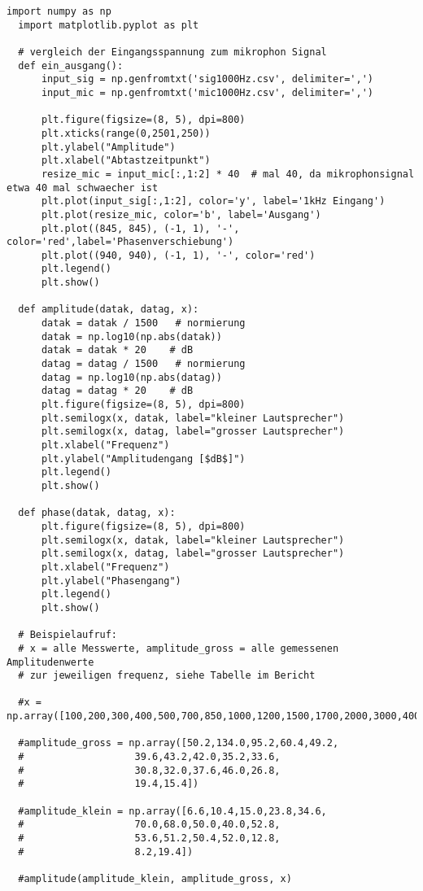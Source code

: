 
 \begin{lstlisting}[style=PYTHON,frame=single,
  caption=Erstellen der Grafiken
  captionpos=b,
  label=lst:plot]
  import numpy as np
  import matplotlib.pyplot as plt
  
  # vergleich der Eingangsspannung zum mikrophon Signal
  def ein_ausgang():
      input_sig = np.genfromtxt('sig1000Hz.csv', delimiter=',')
      input_mic = np.genfromtxt('mic1000Hz.csv', delimiter=',')    
      
      plt.figure(figsize=(8, 5), dpi=800)
      plt.xticks(range(0,2501,250))
      plt.ylabel("Amplitude")
      plt.xlabel("Abtastzeitpunkt")
      resize_mic = input_mic[:,1:2] * 40  # mal 40, da mikrophonsignal etwa 40 mal schwaecher ist
      plt.plot(input_sig[:,1:2], color='y', label='1kHz Eingang')
      plt.plot(resize_mic, color='b', label='Ausgang')
      plt.plot((845, 845), (-1, 1), '-', color='red',label='Phasenverschiebung')
      plt.plot((940, 940), (-1, 1), '-', color='red')
      plt.legend()
      plt.show()
  
  def amplitude(datak, datag, x):
      datak = datak / 1500   # normierung
      datak = np.log10(np.abs(datak))
      datak = datak * 20    # dB
      datag = datag / 1500   # normierung
      datag = np.log10(np.abs(datag))
      datag = datag * 20    # dB
      plt.figure(figsize=(8, 5), dpi=800)   
      plt.semilogx(x, datak, label="kleiner Lautsprecher")
      plt.semilogx(x, datag, label="grosser Lautsprecher")
      plt.xlabel("Frequenz")
      plt.ylabel("Amplitudengang [$dB$]")
      plt.legend()
      plt.show()
  
  def phase(datak, datag, x):
      plt.figure(figsize=(8, 5), dpi=800)   
      plt.semilogx(x, datak, label="kleiner Lautsprecher")
      plt.semilogx(x, datag, label="grosser Lautsprecher")
      plt.xlabel("Frequenz")
      plt.ylabel("Phasengang")
      plt.legend()
      plt.show()
      
  # Beispielaufruf:
  # x = alle Messwerte, amplitude_gross = alle gemessenen Amplitudenwerte
  # zur jeweiligen frequenz, siehe Tabelle im Bericht
  
  #x = np.array([100,200,300,400,500,700,850,1000,1200,1500,1700,2000,3000,4000,5000,6000,10000])
  
  #amplitude_gross = np.array([50.2,134.0,95.2,60.4,49.2,
  #                   39.6,43.2,42.0,35.2,33.6,
  #                   30.8,32.0,37.6,46.0,26.8,
  #                   19.4,15.4])
  
  #amplitude_klein = np.array([6.6,10.4,15.0,23.8,34.6,
  #                   70.0,68.0,50.0,40.0,52.8,
  #                   53.6,51.2,50.4,52.0,12.8,
  #                   8.2,19.4])
                 
  #amplitude(amplitude_klein, amplitude_gross, x)
  
 \end{lstlisting}
 
